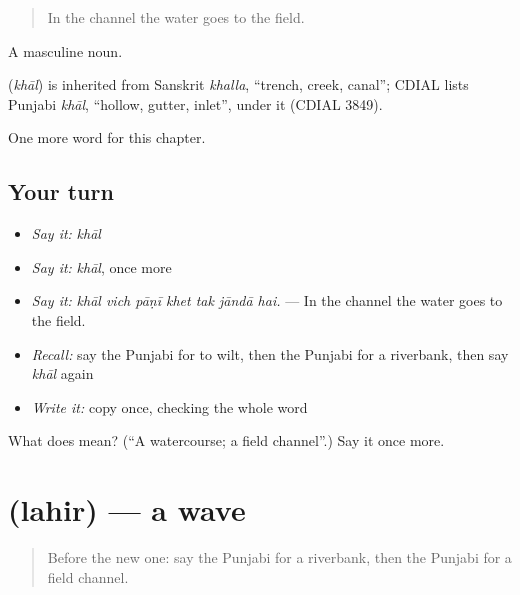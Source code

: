 \begin{quote}
In the channel the water goes to the field.
\end{quote}

A masculine noun.

\begin{cousinweb}
\textbf{} (\emph{khāl}) is inherited from Sanskrit \emph{khalla}, \textquotedblleft{}trench, creek, canal\textquotedblright{}; CDIAL lists Punjabi \emph{khāl}, \textquotedblleft{}hollow, gutter, inlet\textquotedblright{}, under it (CDIAL 3849).
\end{cousinweb}

\begin{grammarlens}[title={What you've built}]
One more word for this chapter.
\end{grammarlens}

\subsection*{Your turn}
\begin{itemize}
\raggedright
  \item \emph{Say it:} \emph{khāl}
  \item \emph{Say it:} \emph{khāl}, once more
  \item \emph{Say it:} \emph{khāl vich pāṇī khet tak jāndā hai.} — In the channel the water goes to the field.
  \item \emph{Recall:} say the Punjabi for to wilt, then the Punjabi for a riverbank, then say \emph{khāl} again
  \item \emph{Write it:} copy \textbf{} once, checking the whole word
\end{itemize}

\begin{tcolorbox}[breakable,colback=teal!4,colframe=teal!35!black,title={Before you move on}]
What does  mean? (\textquotedblleft{}A watercourse; a field channel\textquotedblright{}.) Say it once more.
\end{tcolorbox}
\section[\texorpdfstring{\pa{ਲਹਿਰ} (lahir)}{ਲਹਿਰ (lahir)}]{ (lahir) — a wave}

\label{lesson:PA-C299-lahir}



\begin{quote}
Before the new one: say the Punjabi for a riverbank, then the Punjabi for a field channel.
\end{quote}

